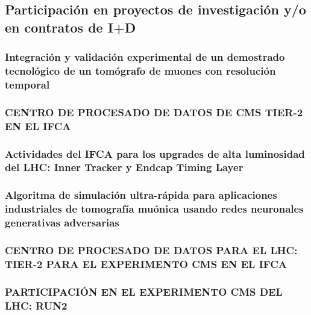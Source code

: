 \documentclass[a4paper, 11pt, twoside, openright]{report}
\begin{document}
\subsection{Participación en proyectos de investigación y/o en contratos de I+D}

\subsubsection{Integración y validación experimental de un demostrado tecnológico de un tomógrafo de muones con resolución temporal}


\subsubsection{CENTRO DE PROCESADO DE DATOS DE CMS TIER-2 EN EL IFCA}


\subsubsection{Actividades del IFCA para los upgrades de alta luminosidad del LHC: Inner Tracker y Endcap Timing Layer}


\subsubsection{Algoritma de simulación ultra-rápida para aplicaciones industriales de tomografía muónica usando redes neuronales generativas adversarias}


\subsubsection{CENTRO DE PROCESADO DE DATOS PARA EL LHC: TIER-2 PARA EL EXPERIMENTO CMS EN EL IFCA}


\subsubsection{PARTICIPACIÓN EN EL EXPERIMENTO CMS DEL LHC: RUN2}

\end{document}
